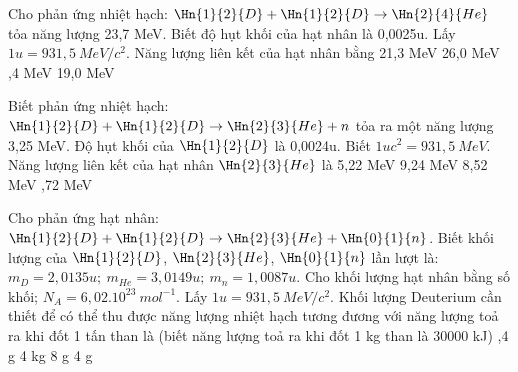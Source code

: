 \begin{vidu}%
Cho phản ứng nhiệt hạch: $\Hn{1}{2}{D}+\Hn{1}{2}{D}\to\Hn{2}{4}{He}$ tỏa năng lượng 23,7 MeV. Biết độ hụt khối của hạt nhân  là 0,0025u. Lấy $1u=931,5\ MeV/c^2$. Năng lượng liên kết của hạt nhân  bằng
\choice
{21,3 MeV}
{26,0 MeV}
{,4 MeV}
{19,0 MeV}
\end{vidu}
\begin{vidu}%
Biết phản ứng nhiệt hạch: $\Hn{1}{2}{D}+\Hn{1}{2}{D}\to \Hn{2}{3}{He}+n$ tỏa ra một năng lượng 3,25 MeV. Độ hụt khối của $\Hn{1}{2}{D}$ là 0,0024u. Biết $1uc^2=931,5\ MeV$. Năng lượng liên kết của hạt nhân $\Hn{2}{3}{He}$ là
\choice
{5,22 MeV}
{9,24 MeV}
{8,52 MeV}
{,72 MeV}
\end{vidu}
\begin{vidu}%
Cho phản ứng hạt nhân: $\Hn{1}{2}{D}+\Hn{1}{2}{D}\to \Hn{2}{3}{He}+\Hn{0}{1}{n}$. Biết khối lượng của $\Hn{1}{2}{D}$,  $\Hn{2}{3}{He}$, $\Hn{0}{1}{n}$ lần lượt là: ${m_D}=2,0135u;\ m_{He}=3,0149u;\ {m_n}=1,0087u$. Cho khối lượng hạt nhân bằng số khối; $N_A=6,02.10^{23}\ mol^{-1}$. Lấy $1u=931,5\ MeV/c^2$. Khối lượng Deuterium cần thiết để có thể thu được năng lượng nhiệt hạch tương đương với năng lượng toả ra khi đốt 1 tấn than là (biết năng lượng toả ra khi đốt 1 kg than là 30000 kJ)
\choice
{,4 g}
{4 kg}
{8 g}
{4 g}
\end{vidu}
